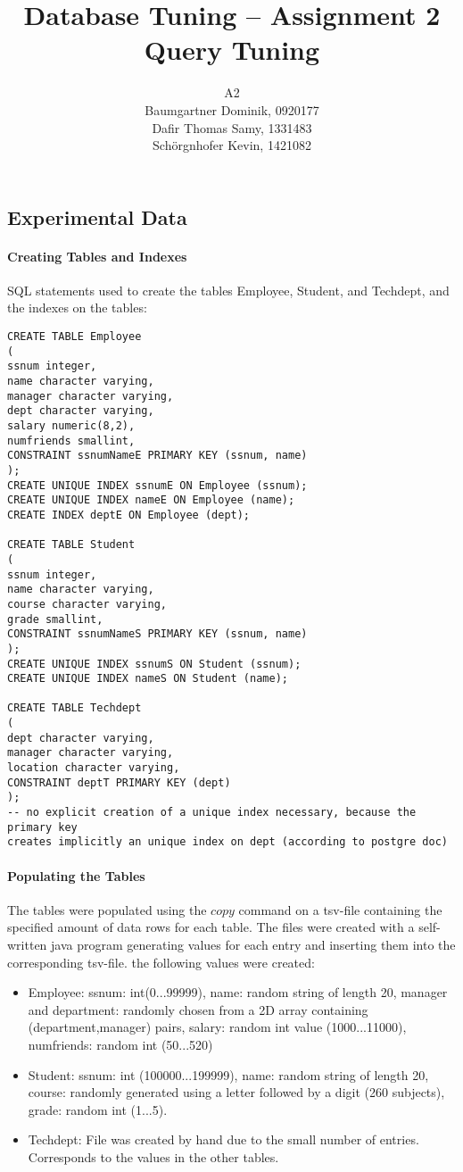 \documentclass[11pt]{scrartcl}
\title{
  \textbf{\large Database Tuning -- Assignment 2}\\
  Query Tuning
}
\author{
 A2\\
\large Baumgartner Dominik, 0920177 \\
\large Dafir Thomas Samy, 1331483 \\
\large Sch\"orgnhofer Kevin, 1421082
}
\begin{document}
\maketitle

\subsection*{Experimental Data}

\paragraph{Creating Tables and Indexes}

SQL statements used to create the tables { Employee}, {
  Student}, and { Techdept}, and the indexes on the tables:

{\small
\begin{verbatim}
CREATE TABLE Employee
(
ssnum integer,
name character varying,
manager character varying,
dept character varying,
salary numeric(8,2),
numfriends smallint,
CONSTRAINT ssnumNameE PRIMARY KEY (ssnum, name)
);
CREATE UNIQUE INDEX ssnumE ON Employee (ssnum);
CREATE UNIQUE INDEX nameE ON Employee (name);
CREATE INDEX deptE ON Employee (dept);

CREATE TABLE Student
(
ssnum integer,
name character varying,
course character varying,
grade smallint,
CONSTRAINT ssnumNameS PRIMARY KEY (ssnum, name)
);
CREATE UNIQUE INDEX ssnumS ON Student (ssnum);
CREATE UNIQUE INDEX nameS ON Student (name);

CREATE TABLE Techdept
(
dept character varying,
manager character varying,
location character varying,
CONSTRAINT deptT PRIMARY KEY (dept)
);
-- no explicit creation of a unique index necessary, because the primary key
creates implicitly an unique index on dept (according to postgre doc)
\end{verbatim}
}

\paragraph{Populating the Tables}

	The tables were populated using the $copy$ command on a tsv-file containing the specified amount of data rows for each table. The files were created with a self-written java program generating values for each entry and inserting them into the corresponding tsv-file.
	the following values were created:

	\begin{itemize}
		\item Employee: ssnum: int(0...99999), name: random string of length 20, manager and department: randomly chosen from a 2D array containing (department,manager) pairs, salary: random int value (1000...11000), numfriends: random int (50...520)
		\item Student:  ssnum: int (100000...199999), name: random string of length 20, course: randomly generated using a letter followed by a digit (260 subjects), grade: random int (1...5).
		\item Techdept: File was created by hand due to the small number of entries. Corresponds to the values in the other tables.
	\end{itemize}
\end{document}
